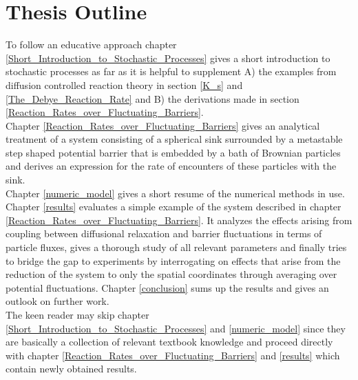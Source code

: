 \section{Thesis Outline}
To follow an educative approach chapter \ref{Short_Introduction_to_Stochastic_Processes} gives a short introduction to stochastic processes as far as it is helpful to supplement A) the examples from diffusion controlled reaction theory in section \ref{K_s} and \ref{The_Debye_Reaction_Rate} and B) the derivations made in section \ref{Reaction_Rates_over_Fluctuating_Barriers}. \\
Chapter \ref{Reaction_Rates_over_Fluctuating_Barriers} gives an analytical treatment of a system consisting of a spherical sink surrounded by a metastable step shaped potential barrier that is embedded by a bath of Brownian particles and derives an expression for the rate of encounters of these particles with the sink. \\
Chapter \ref{numeric_model} gives a short resume of the numerical methods in use. Chapter \ref{results} evaluates a simple example of the system described in chapter \ref{Reaction_Rates_over_Fluctuating_Barriers}. It analyzes the effects arising from coupling between diffusional relaxation and barrier fluctuations in terms of particle fluxes, gives a thorough study of all relevant parameters and finally tries to bridge the gap to experiments by interrogating on effects that arise from the reduction of the system to only the spatial coordinates through averaging over potential fluctuations. Chapter \ref{conclusion} sums up the results and gives an outlook on further work. \\

The keen reader may skip chapter \ref{Short_Introduction_to_Stochastic_Processes} and \ref{numeric_model} since they are basically a collection of relevant textbook knowledge and proceed directly with chapter \ref{Reaction_Rates_over_Fluctuating_Barriers} and \ref{results} which contain newly obtained results. 
